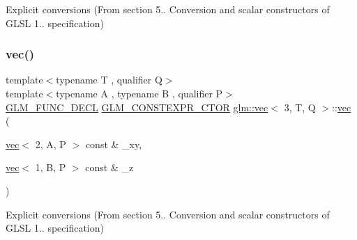Explicit conversions (From section 5.. Conversion and scalar constructors of G\+L\+SL 1.. specification) 

\mbox{\label{structglm_1_1vec_3_013_00_01_t_00_01_q_01_4_a800af9ada84dfb76714e279e81eb266e}} 
\subsubsection{\texorpdfstring{vec()}{vec()}\hspace{0.1cm}{\footnotesize\ttfamily [9/23]}}
{\footnotesize\ttfamily template$<$typename T , qualifier Q$>$ \\
template$<$typename A , typename B , qualifier P$>$ \\
\hyperlink{setup_8hpp_ab2d052de21a70539923e9bcbf6e83a51}{G\+L\+M\+\_\+\+F\+U\+N\+C\+\_\+\+D\+E\+CL} \hyperlink{setup_8hpp_ad34178a09666081abdb573c14d1f4a5a}{G\+L\+M\+\_\+\+C\+O\+N\+S\+T\+E\+X\+P\+R\+\_\+\+C\+T\+OR} \hyperlink{structglm_1_1vec}{glm\+::vec}$<$ 3, T, Q $>$\+::\hyperlink{structglm_1_1vec}{vec} (\begin{DoxyParamCaption}\item[{\hyperlink{structglm_1_1vec}{vec}$<$ 2, A, P $>$ const \&}]{\+\_\+xy,  }\item[{\hyperlink{structglm_1_1vec}{vec}$<$ 1, B, P $>$ const \&}]{\+\_\+z }\end{DoxyParamCaption})}



Explicit conversions (From section 5.. Conversion and scalar constructors of G\+L\+SL 1.. specification) 

\mbox{\label{structglm_1_1vec_3_013_00_01_t_00_01_q_01_4_a06a314f757e08eddfb46a1c759cf5c8e}} 
